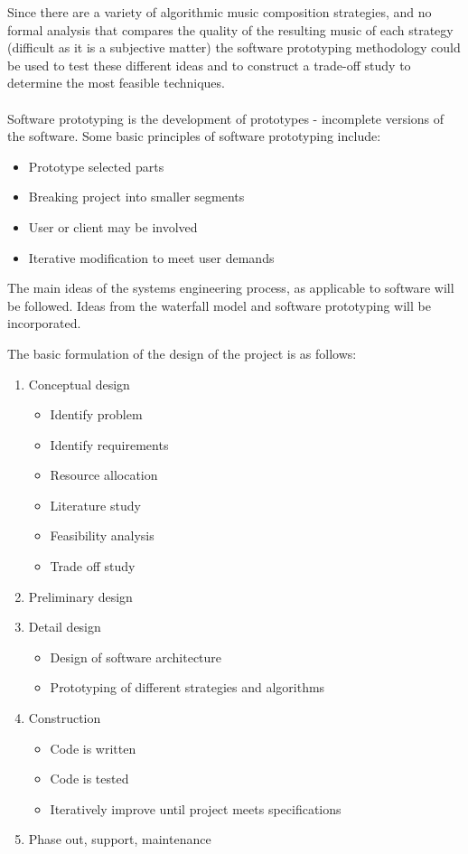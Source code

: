 Since there are a variety of algorithmic music composition strategies, and no formal analysis that compares the quality of the resulting music of each strategy (difficult as it is a subjective matter) the software prototyping methodology could be used to test these different ideas and to construct a trade-off study to determine the most feasible techniques.
\\
\\
Software prototyping is the development of prototypes - incomplete versions of the software.
Some basic principles of software prototyping include:
\begin{itemize}
\item Prototype selected parts
\item Breaking project into smaller segments
\item User or client may be involved
\item Iterative modification to meet user demands
\end{itemize}

The main ideas of the systems engineering process, as applicable to software will be followed. Ideas from the waterfall model and software prototyping will be incorporated.

The basic formulation of the design of the project is as follows:
\begin{enumerate}
\item Conceptual design
\begin{itemize}
\item Identify problem
\item Identify requirements
\item Resource allocation
\item Literature study
\item Feasibility analysis
\item Trade off study
\end{itemize}
\item Preliminary design
\item Detail design
\begin{itemize}
\item Design of software architecture
\item Prototyping of different strategies and algorithms
\end{itemize}
\item Construction
\begin{itemize}
\item Code is written
\item Code is tested
\item Iteratively improve until project meets specifications
\end{itemize}
\item Phase out, support, maintenance
\end{enumerate}

